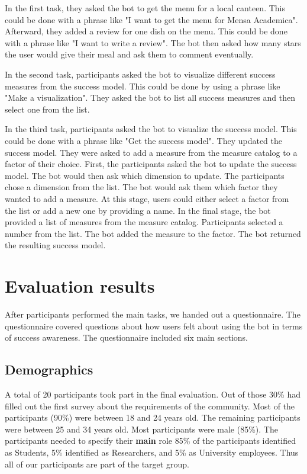 In the first task, they asked the bot to get the menu for a local canteen. This could be done with a phrase like "I want to get the menu for Mensa Academica".
Afterward, they added a review for one dish on the menu. This could be done with a phrase like "I want to write a review". The bot then asked how many stars the user would give their meal and ask them to comment eventually.  

In the second task, participants asked the bot to visualize different success measures from the success model. This could be done by using a phrase like "Make a visualization". They asked the bot to list all success measures and then select one from the list.

In the third task, participants asked the bot to visualize the success model. This could be done with a phrase like "Get the success model". They updated the success model. They were asked to add a measure from the measure catalog to a factor of their choice. 
First, the participants asked the bot to update the success model. The bot would then ask which dimension to update. 
The participants chose a dimension from the list. 
The bot would ask them which factor they wanted to add a measure. 
At this stage, users could either select a factor from the list or add a new one by providing a name. 
In the final stage, the bot provided a list of measures from the measure catalog.
Participants selected a number from the list. 
The bot added the measure to the factor.
The bot returned the resulting success model.

\section{Evaluation results}

After participants performed the main tasks, we handed out a questionnaire.
The questionnaire covered questions about how users felt about using the bot in terms of success awareness. The questionnaire included six main sections. 

\subsection{Demographics}
A total of 20 participants took part in the final evaluation. Out of those 30\% had filled out the first survey about the requirements of the community. 
Most of the participants (90\%) were between 18 and 24 years old. The remaining participants were between 25 and 34 years old. Most participants were male (85\%).
The participants needed to specify their \textbf{main} role 85\% of the participants identified as Students, 5\% identified as Researchers, and 5\% as University employees. Thus all of our participants are part of the target group.

